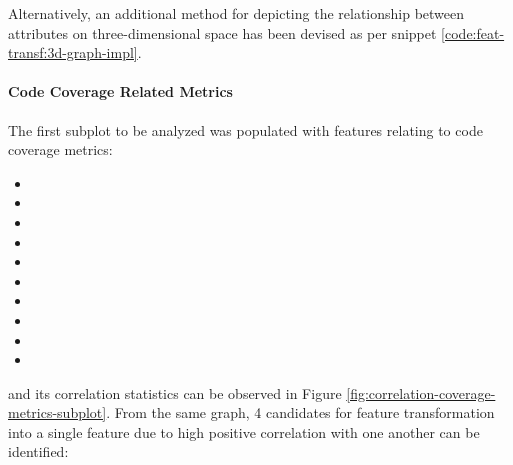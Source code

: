 Alternatively, an additional method for depicting the relationship between attributes on three-dimensional space has been devised as per snippet \ref{code:feat-transf:3d-graph-impl}.

\FloatBarrier

\paragraph{Code Coverage Related Metrics}\label{sec:impl-data-analysis:corr:code-coverage}
The first subplot to be analyzed was populated with features relating to code coverage metrics:
\begin{itemize}\label{lst:code-coverage-candidates}
    \item \branchCoverage{}
    \item \overallBranchCoverage{}
    \item \overallCoverage{}
    \item \overallLineCoverage{}
    \item \overallUncoveredConditions{}
    \item \overallUncoveredLines{}
    \item \coverage{}
    \item \lineCoverage{}
    \item \uncoveredConditions{}
    \item \uncoveredLines{}
\end{itemize}
and its correlation statistics can be observed in Figure \ref{fig:correlation-coverage-metrics-subplot}. From the same graph, 4 candidates for feature transformation into a single feature due to high positive correlation with one another can be identified:
